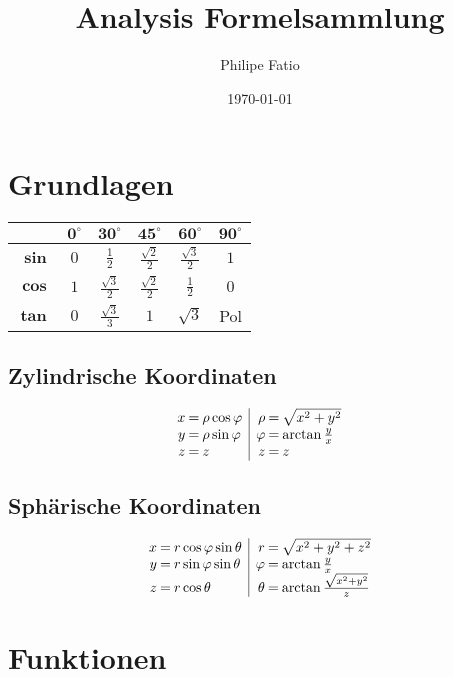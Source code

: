 \documentclass[12pt]{article}
\author{Philipe Fatio}
\title{Analysis Formelsammlung}
\date{\today}
\begin{document}
	\begin{multicols*}{3}
		\section{Grundlagen} %
			\begin{tabular}{r|ccccc}
			 	& $\mathbf{0^{\circ}}$ & $\mathbf{30^{\circ}}$ & $\mathbf{45^{\circ}}$ & $\mathbf{60^{\circ}}$ & $\mathbf{90^{\circ}}$\\
				\hline
				$\boldsymbol{\sin}$ & $0$ & $\frac{1}{2}$ & $\frac{\sqrt{2}}{2}$ & $\frac{\sqrt{3}}{2}$ & $1$\\
				$\boldsymbol{\cos}$ & $1$ & $\frac{\sqrt{3}}{2}$ & $\frac{\sqrt{2}}{2}$ & $\frac{1}{2}$ & $0$\\
				$\boldsymbol{\tan}$ & $0$ & $\frac{\sqrt{3}}{3}$ & $1$ & $\sqrt{3}$ & Pol\\
			\end{tabular}
			\subsection{Zylindrische Koordinaten} %
				\[
					\begin{array}{r@{\:=\:}l|r@{\:=\:}l}
						x & \rho \cos{\varphi} & \rho & \sqrt{x^2 + y^2} \\
						y & \rho \sin{\varphi} & \varphi & \arctan{\frac{y}{x}} \\
						z & z & z & z
					\end{array}
				\]
			\subsection{Sphärische Koordinaten} %
				\[
					\begin{array}{r@{\:=\:}l|r@{\:=\:}l}
						x & r \cos{\varphi} \sin{\theta} & r & \sqrt{x^2 + y^2 + z^2} \\
						y & r \sin{\varphi} \sin{\theta} & \varphi & \arctan{\frac{y}{x}} \\
						z & r \cos{\theta} & \theta & \arctan{\frac{\sqrt{x^2 + y^2}}{z}}
					\end{array}
				\]
		\section{Funktionen} %
			

\end{multicols*}
\end{document}
